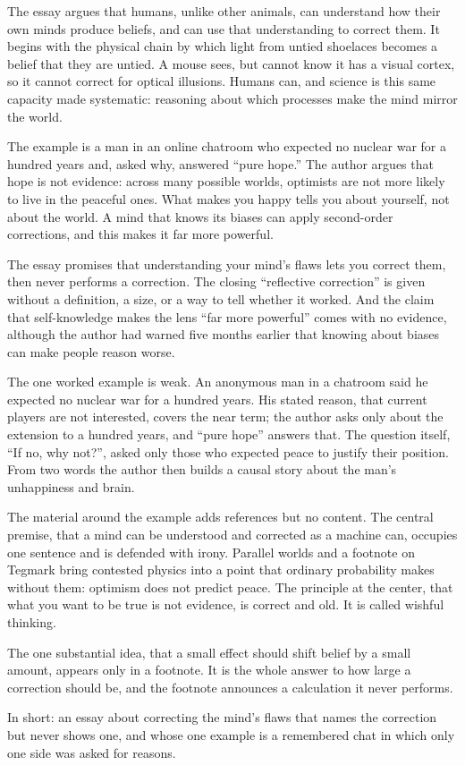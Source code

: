 \begin{afterword}
\summaryhead

The essay argues that humans, unlike other animals, can understand how their own minds produce beliefs, and can use that understanding to correct them. It begins with the physical chain by which light from untied shoelaces becomes a belief that they are untied. A mouse sees, but cannot know it has a visual cortex, so it cannot correct for optical illusions. Humans can, and science is this same capacity made systematic: reasoning about which processes make the mind mirror the world.

The example is a man in an online chatroom who expected no nuclear war for a hundred years and, asked why, answered ``pure hope.'' The author argues that hope is not evidence: across many possible worlds, optimists are not more likely to live in the peaceful ones. What makes you happy tells you about yourself, not about the world. A mind that knows its biases can apply second-order corrections, and this makes it far more powerful.

\responsehead

The essay promises that understanding your mind's flaws lets you correct them, then never performs a correction. The closing ``reflective correction'' is given without a definition, a size, or a way to tell whether it worked. And the claim that self-knowledge makes the lens ``far more powerful'' comes with no evidence, although the author had warned five months earlier that knowing about biases can make people reason worse.

The one worked example is weak. An anonymous man in a chatroom said he expected no nuclear war for a hundred years. His stated reason, that current players are not interested, covers the near term; the author asks only about the extension to a hundred years, and ``pure hope'' answers that. The question itself, ``If no, why not?'', asked only those who expected peace to justify their position. From two words the author then builds a causal story about the man's unhappiness and brain.

The material around the example adds references but no content. The central premise, that a mind can be understood and corrected as a machine can, occupies one sentence and is defended with irony. Parallel worlds and a footnote on Tegmark bring contested physics into a point that ordinary probability makes without them: optimism does not predict peace. The principle at the center, that what you want to be true is not evidence, is correct and old. It is called wishful thinking.

The one substantial idea, that a small effect should shift belief by a small amount, appears only in a footnote. It is the whole answer to how large a correction should be, and the footnote announces a calculation it never performs.

In short: an essay about correcting the mind's flaws that names the correction but never shows one, and whose one example is a remembered chat in which only one side was asked for reasons.
\end{afterword}
